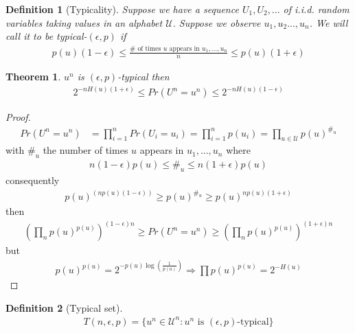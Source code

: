 \documentclass[twoside]{article}
\newtheorem{theorem}{Theorem}[section]
\newtheorem{definition}{Definition}[section]
\theoremstyle{definition} %
\def\U{\mathcal{U}}
\begin{document}
\begin{definition}[Typicality]
  \label{def:typicality}
Suppose we have a sequence $U_1, U_2, ...$ of i.i.d. random variables taking values in an alphabet $\U$.
Suppose we observe $u_1,u_2..., u_n$. We will call it to be \textit{typical-$(\epsilon, p)$} if
\begin{align*}
  p(u) (1 - \epsilon)
  \leq \frac{\# \text{ of times $u$ appears in $u_1, ..., u_n$}}{n}
  \leq p(u)(1+\epsilon)
\end{align*}
\end{definition}

\begin{theorem}
  $u^n$ is $(\epsilon, p)$-typical then
  \begin{align*}
    2^{-n H(u)(1 + \epsilon)}
    \leq Pr(U^n = u^n)
    \leq 2^{-n H(u)(1 - \epsilon)}
  \end{align*}
\end{theorem}

\begin{proof}
  \begin{align*}
    Pr(U^n = u^n) &= \prod_{i=1}^n Pr(U_i = u_i) = \prod_{i=1}^n p(u_i) = \prod_{u \in \U} p(u)^{\#_u}
  \end{align*}
  with $\#_u$ the number of times $u$ appears in $u_1, ..., u_n$ where
  \begin{align*}
    n (1-\epsilon) p(u) \leq \#_u \leq n(1+\epsilon)p(u)
  \end{align*}
  consequently
  \begin{align*}
    p(u)^{(n p(u)(1-\epsilon))} \geq p(u)^{\#_u} \geq p(u)^{n p(u)(1+\epsilon)}
  \end{align*}
  then
  \begin{align*}
    (\prod_{n} p(u)^{p(u)})^{(1-\epsilon)n}
    \geq Pr(U^n = u^n)
    \geq (\prod_{n} p(u)^{p(u)})^{(1+\epsilon)n}
  \end{align*}
  but
  \begin{align*}
    p(u)^{p(u)} = 2^{-p(u) \log(\frac{1}{p(u)})} \Rightarrow \prod p(u)^{p(u)} = 2^{-H(u)}
  \end{align*}
\end{proof}

\begin{definition}[Typical set]
  \begin{align*}
    T(n, \epsilon, p) = \{ u^n \in \U^n : u^n \text{ is } (\epsilon, p)\text{-typical}\}
  \end{align*}
\end{definition}
\end{document}
